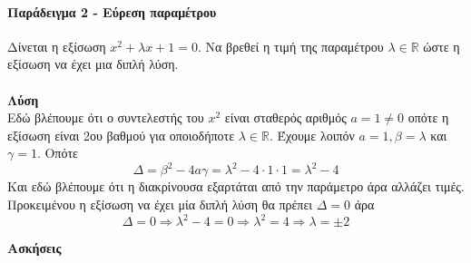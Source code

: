 \documentclass[11pt,a4paper]{article}
\begin{document}
\paragraph{Παράδειγμα 2 - Εύρεση παραμέτρου}
Δίνεται η εξίσωση $ x^2+\lambda x+1=0 $. Να βρεθεί η τιμή της παραμέτρου $ \lambda\in\mathbb{R} $ ώστε η εξίσωση να έχει μια διπλή λύση.\\\\
\textbf{Λύση}\\
Εδώ βλέπουμε ότι ο συντελεστής του $ x^2 $ είναι σταθερός αριθμός $ a=1\neq 0 $ οπότε η εξίσωση είναι 2ου βαθμού για οποιοδήποτε $ \lambda\in\mathbb{R} $. Έχουμε λοιπόν $ a=1,\beta=\lambda $ και $ \gamma=1 $. Οπότε
\[ \Delta=\beta^2-4a\gamma=\lambda^2-4\cdot1\cdot1=\lambda^2-4 \]
Και εδώ βλέπουμε ότι η διακρίνουσα εξαρτάται από την παράμετρο άρα αλλάζει τιμές. Προκειμένου η εξίσωση να έχει μία διπλή λύση θα πρέπει $ \Delta=0 $ άρα
\[ \Delta=0\Rightarrow \lambda^2-4=0\Rightarrow\lambda^2=4\Rightarrow\lambda=\pm 2 \]
\newpage
\begin{center}
\textbf{{\Large Ασκήσεις}}
\end{center}
\end{document}

